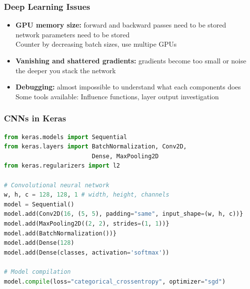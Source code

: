 \documentclass[aspectratio=169]{beamer}
\begin{document}
\begin{frame}
\begin{columns}
\begin{column}{0.48\textwidth}
\begin{figure}
        \end{figure}
    \end{column}
\end{columns}
\end{frame}

\begin{frame}
\frametitle{Deep Learning Issues}

\begin{itemize}
    \item \textbf{GPU memory size:} forward and backward passes need to be stored\\
    network parameters need to be stored\\
    Counter by decreasing batch sizes, use multipe GPUs
    \item \textbf{Vanishing and shattered gradients:} gradients become too small or noise the deeper you stack the network\\
    \item \textbf{Debugging:} almost impossible to understand what each components does\\
    Some tools available: Influence functions, layer output investigation
\end{itemize}
\end{frame}

\begin{frame}[fragile]
\frametitle{CNNs in Keras}

\begin{lstlisting}[language=Python]
from keras.models import Sequential
from keras.layers import BatchNormalization, Conv2D,
                         Dense, MaxPooling2D
from keras.regularizers import l2

# Convolutional neural network
w, h, c = 128, 128, 1 # width, height, channels
model = Sequential()
model.add(Conv2D(16, (5, 5), padding="same", input_shape=(w, h, c))}
model.add(MaxPooling2D((2, 2), strides=(1, 1))}
model.add(BatchNormalization())}
model.add(Dense(128)
model.add(Dense(classes, activation='softmax'))

# Model compilation
model.compile(loss="categorical_crossentropy", optimizer="sgd")
\end{lstlisting}

\end{frame}
\end{document}
